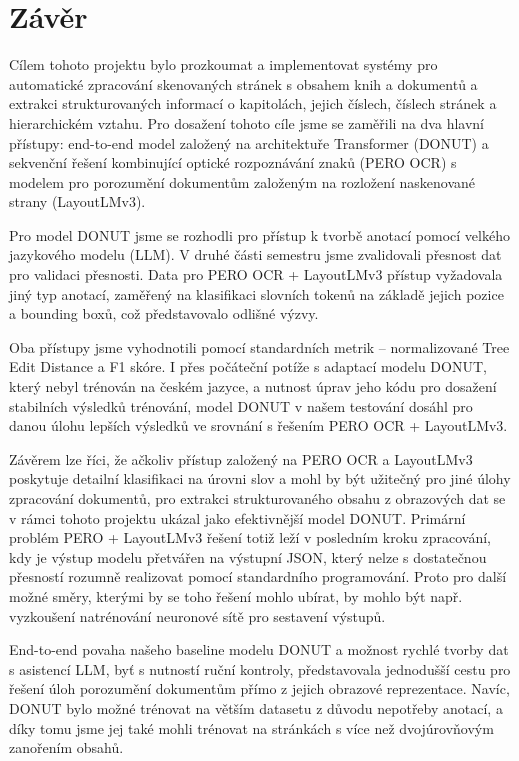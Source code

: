 \documentclass{article}
\begin{document}
\newpage
\section{Závěr}
Cílem tohoto projektu bylo prozkoumat a implementovat systémy pro automatické zpracování skenovaných stránek s obsahem knih a dokumentů a extrakci strukturovaných informací o kapitolách, jejich číslech, číslech stránek a hierarchickém vztahu. Pro dosažení tohoto cíle jsme se zaměřili na dva hlavní přístupy: end-to-end model založený na architektuře Transformer (DONUT) a sekvenční řešení kombinující optické rozpoznávání znaků (PERO OCR) s modelem pro porozumění dokumentům založeným na rozložení naskenované strany (LayoutLMv3).

Pro model DONUT jsme se rozhodli pro přístup k tvorbě anotací pomocí velkého jazykového modelu (LLM). V druhé části semestru jsme zvalidovali přesnost dat pro validaci přesnosti. Data pro PERO OCR + LayoutLMv3 přístup vyžadovala jiný typ anotací, zaměřený na klasifikaci slovních tokenů na základě jejich pozice a bounding boxů, což představovalo odlišné výzvy.


Oba přístupy jsme vyhodnotili pomocí standardních metrik -- normalizované Tree Edit Distance a F1 skóre. I přes počáteční potíže s adaptací modelu DONUT, který nebyl trénován na českém jazyce, a nutnost úprav jeho kódu pro dosažení stabilních výsledků trénování, model DONUT v našem testování dosáhl pro danou úlohu lepších výsledků ve srovnání s řešením PERO OCR + LayoutLMv3.

Závěrem lze říci, že ačkoliv přístup založený na PERO OCR a LayoutLMv3 poskytuje detailní klasifikaci na úrovni slov a mohl by být užitečný pro jiné úlohy zpracování dokumentů, pro extrakci strukturovaného obsahu z obrazových dat se v rámci tohoto projektu ukázal jako efektivnější model DONUT. Primární problém PERO + LayoutLMv3 řešení totiž leží v posledním kroku zpracování, kdy je výstup modelu přetvářen na výstupní JSON, který nelze s dostatečnou přesností rozumně realizovat pomocí standardního programování. Proto pro další možné směry, kterými by se toho řešení mohlo ubírat, by mohlo být např. vyzkoušení natrénování neuronové sítě pro sestavení výstupů. 

End-to-end povaha našeho baseline modelu DONUT a možnost rychlé tvorby dat s asistencí LLM, byť s nutností ruční kontroly, představovala jednodušší cestu pro řešení úloh porozumění dokumentům přímo z jejich obrazové reprezentace. Navíc, DONUT bylo možné trénovat na větším datasetu z důvodu nepotřeby anotací, a díky tomu jsme jej také mohli trénovat na stránkách s více než dvojúrovňovým zanořením obsahů.


\newpage


\end{document}
